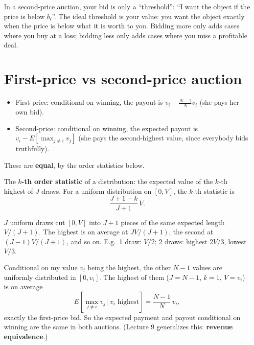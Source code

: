 \documentclass[11pt,a4paper,openany]{book}
\begin{document}
\begin{rembox}[title=In plain words]
In a second-price auction, your bid is only a ``threshold'': ``I want the object if the price
is below $b_i$''. The ideal threshold is your value: you want the object exactly when the
price is below what it is worth to you. Bidding more only adds cases where you buy at a loss;
bidding less only adds cases where you miss a profitable deal.
\end{rembox}


\section{First-price vs second-price auction}

\begin{propbox}[title=Same expected payout conditional on winning]
\begin{itemize}
  \item First-price: conditional on winning, the payout is $v_i - \frac{N-1}{N} v_i$ (she
        pays her own bid).
  \item Second-price: conditional on winning, the expected payout is
        $v_i - E[\max_{j \neq i} v_j]$ (she pays the second-highest value, since everybody
        bids truthfully).
\end{itemize}
These are \textbf{equal}, by the order statistics below.
\end{propbox}

\begin{defnbox}[title=Order statistics]
The \textbf{$k$-th order statistic} of a distribution: the expected value of the $k$-th
highest of $J$ draws. For a uniform distribution on $[0, V]$, the $k$-th statistic is
\[
\frac{J + 1 - k}{J + 1}\, V.
\]
\end{defnbox}

\begin{rembox}[title=In plain words]
$J$ uniform draws cut $[0, V]$ into $J+1$ pieces of the same expected length $V/(J+1)$. The
highest is on average at $J V/(J+1)$, the second at $(J-1)V/(J+1)$, and so on. E.g.\ 1 draw:
$V/2$; 2 draws: highest $2V/3$, lowest $V/3$.
\end{rembox}

\begin{propbox}[title=The computation]
Conditional on my value $v_i$ being the highest, the other $N-1$ values are uniformly
distributed in $[0, v_i]$. The highest of them ($J = N-1$, $k = 1$, $V = v_i$) is on average
\[
E[\max_{j \neq i} v_j \,|\, v_i \text{ highest}] = \frac{N-1}{N}\, v_i,
\]
exactly the first-price bid. So the expected payment and payout conditional on winning are
the same in both auctions. (Lecture 9 generalizes this: \textbf{revenue equivalence}.)
\end{propbox}
\end{document}
